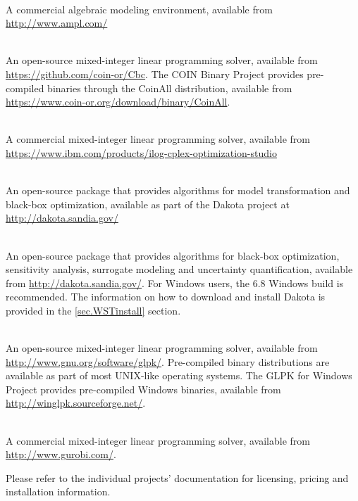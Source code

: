 \begin{description}[topsep=0pt,parsep=0.5em,itemsep=-0.4em,labelindent=2em,leftmargin=4em]
\item[AMPL]\hfill\\ A commercial algebraic modeling environment, available from
  \url{http://www.ampl.com/}
\item[CBC]\hfill\\ An open-source mixed-integer linear programming
  solver, available from \url{https://github.com/coin-or/Cbc}. The
  COIN Binary Project provides pre-compiled binaries through the
  CoinAll distribution,
  available from \url{https://www.coin-or.org/download/binary/CoinAll}.
\item[CPLEX]\hfill\\ A commercial mixed-integer linear programming solver,
  available from
  \url{https://www.ibm.com/products/ilog-cplex-optimization-studio}
\item[Coliny]\hfill\\ An open-source package that provides algorithms for model
  transformation and black-box optimization, available as 
  part of the Dakota project at \url{http://dakota.sandia.gov/}
\item[Dakota]\hfill\\ An open-source package that provides algorithms for
  black-box optimization, sensitivity analysis, surrogate modeling and
  uncertainty quantification, available from
  \url{http://dakota.sandia.gov/}. For Windows users, the
  6.8 Windows build is recommended. The information on how to download and install Dakota is 
  provided in the \ref{sec.WSTinstall} section.
\item[GLPK]\hfill\\ An open-source mixed-integer linear programming
  solver, available from \url{http://www.gnu.org/software/glpk/}.
  Pre-compiled binary distributions are available as part of most
  UNIX-like operating systems. The GLPK for Windows Project
  provides pre-compiled Windows binaries, available from
  \url{http://winglpk.sourceforge.net/}.
\item[Gurobi]\hfill\\ A commercial mixed-integer linear programming solver,
  available from
  \url{http://www.gurobi.com/}.
\end{description}
Please refer to the individual projects' documentation for licensing,
pricing and installation information.

